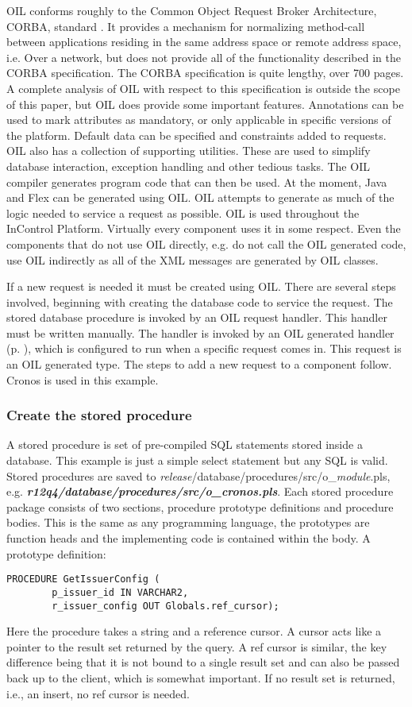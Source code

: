 \documentclass[a4paper, 11pt, titlepage]{article}
\begin{document}
OIL conforms roughly to the Common Object Request Broker Architecture, CORBA, standard \cite{CORBA}. It provides a mechanism for normalizing method-call between applications residing in the same address space or remote address space, i.e. Over a network, but does not provide all of the functionality described in the CORBA specification. The CORBA specification is quite lengthy, over 700 pages. A complete analysis of OIL with respect to this specification is outside the scope of this paper, but OIL does provide some important features. Annotations can be used to mark attributes as mandatory, or only applicable in specific versions of the platform. Default data can be specified and constraints added to requests. OIL also has a collection of supporting utilities. These are used to simplify database interaction, exception handling and other tedious tasks. 
The OIL compiler generates program code that can then be used. At the moment, Java and Flex can be generated using OIL. OIL attempts to generate as much of the logic needed to service a request as possible.
OIL is used throughout the InControl Platform. Virtually every component uses it in some respect. Even the components that do not use OIL directly, e.g. do not call the OIL generated code, use OIL indirectly as all of the XML messages are generated by OIL classes.

If a new request is needed it must be created using OIL. There are several steps involved, beginning with creating the database code to service the request. The stored database procedure is invoked by an OIL request handler. This handler must be written manually. The handler is invoked by an OIL generated handler (p. \pageref{handlerset}), which is configured to run when a specific request comes in. This request is an OIL generated type. The steps to add a new request to a component follow. Cronos is used in this example. 
\subsubsection{Create the stored procedure} 
A stored procedure is set of pre-compiled SQL statements stored inside a database. This example is just a simple select statement but any SQL is valid. Stored procedures are saved to \textit{release}/database/procedures/src/o\_\textit{module}.pls, e.g. \textbf{\textit{r12q4/database/procedures/src/o\_cronos.pls}}. Each stored procedure package consists of two sections, procedure prototype definitions and procedure bodies. This is the same as any programming language, the prototypes are function heads and the implementing code is contained within the body. 
A prototype definition: 
\begin{verbatim} 
PROCEDURE GetIssuerConfig ( 
        p_issuer_id IN VARCHAR2, 
        r_issuer_config OUT Globals.ref_cursor); 
\end{verbatim} 
Here the procedure takes a string and a reference cursor. A cursor acts like a pointer to the result set returned by the query. A ref cursor is similar, the key difference being that it is not bound to a single result set and can also be passed back up to the client, which is somewhat important. If no result set is returned, i.e., an insert, no ref cursor is needed. 
\end{document}
